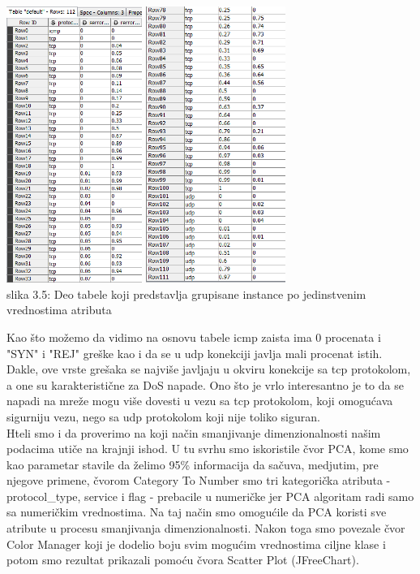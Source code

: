 \documentclass[10pt]{article}
\begin{document}
\begin{center}
\includegraphics[height = 9cm]{v5_1}
\includegraphics[height = 9cm]{v5_2}\\
slika 3.5: Deo tabele koji predstavlja grupisane instance po jedinstvenim vrednostima atributa\\
\end{center}

Kao \v sto mo\v zemo da vidimo na osnovu tabele icmp zaista ima 0 procenata i "SYN" i "REJ" gre\v ske kao i da se u udp konekciji javlja mali procenat istih. Dakle, ove vrste gre\v saka se najvi\v se javljaju u okviru konekcije sa tcp protokolom, a one su karakteristi\v cne za DoS napade. Ono \v sto je vrlo interesantno je to da se napadi na mre\v ze mogu vi\v se dovesti u vezu sa tcp protokolom, koji omogu\' cava sigurniju vezu, nego sa udp protokolom koji nije toliko siguran.\\ 
Hteli smo i da proverimo na koji na\v cin smanjivanje dimenzionalnosti na\v sim podacima uti\v ce na krajnji ishod. U tu svrhu smo iskoristile \v cvor PCA, kome smo kao parametar stavile da \v zelimo 95\% informacija da sa\v cuva, medjutim, pre njegove primene, \v cvorom Category To Number smo tri kategori\v cka atributa - protocol\_type, service i flag - prebacile u numeri\v cke jer PCA algoritam radi samo sa numeri\v ckim vrednostima. Na taj na\v cin smo omogu\' cile da PCA koristi sve atribute u procesu smanjivanja dimenzionalnosti. Nakon toga smo povezale \v cvor Color Manager koji je dodelio boju svim mogu\' cim vrednostima ciljne klase i potom smo rezultat prikazali pomo\' cu \v cvora Scatter Plot (JFreeChart).
\end{document}
